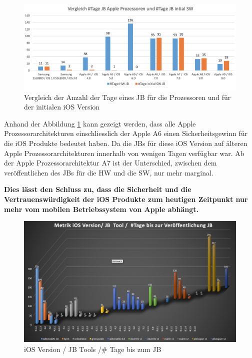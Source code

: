 \begin{figure}[htbp]
        \centering
                \includegraphics[scale=0.55]{Bilder/iDeviceJB-SW-HW.png}
         \caption{Vergleich der Anzahl der Tage eines JB für die Prozessoren und für der initialen iOS Version}
        \label{fig:VergleichJBProzessorSW}      
\end{figure}

Anhand der Abbildung \ref{fig:VergleichJBProzessorSW} kann gezeigt werden, dass alle Apple Prozessorarchitekturen einschliesslich der Apple A6 einen Sicherheitsgewinn für die iOS Produkte bedeutet haben. Da die JBs für diese iOS Version auf älteren Apple Prozessorarchitekturen innerhalb von wenigen Tagen verfügbar war. Ab der Apple Prozessorarchitektur A7 ist der Unterschied, zwischen dem veröffentlichen des JBs für die HW und die SW, nur mehr marginal. \par
\textbf{Dies lässt den Schluss zu, dass die Sicherheit und die Vertrauenswürdigkeit der iOS Produkte zum heutigen Zeitpunkt nur mehr vom mobilen Betriebssystem von Apple abhängt.}  

\begin{figure}[htbp]
        \centering
                \includegraphics[scale=0.41]{Bilder/Frage1_1.png}
        \caption{iOS Version / JB Tools /\# Tage bis zum JB}
        \label{fig:AnalyseiOSJB1}        
\end{figure}

